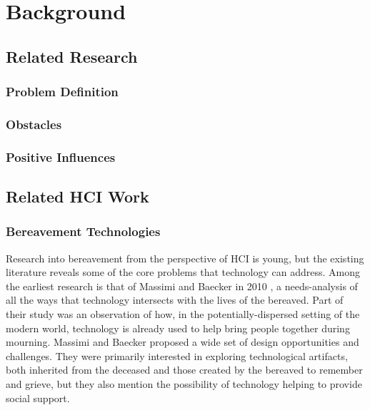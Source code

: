 \chapter{Background}
\section{Related Research}
  \subsection{Problem Definition}

  \subsection{Obstacles}

  \subsection{Positive Influences}

\section{Related HCI Work}
  \subsection{Bereavement Technologies}
  Research into bereavement from the perspective of HCI is young, but the
  existing literature reveals some of the core problems that technology can
  address. Among the earliest research is that of Massimi and Baecker in 2010
  \cite{mm10},
  a needs-analysis of all the ways that technology intersects with the lives of
  the bereaved.
  Part of their study was an observation of how,
  in the potentially-dispersed setting of the modern world, 
  technology is already used to help bring people together during mourning.
  Massimi and Baecker proposed a wide set of design opportunities and challenges.
  They were primarily interested in exploring technological artifacts,
  both inherited from the deceased and those created by the bereaved to
  remember and grieve, but they also mention the possibility of technology
  helping to provide social support.

